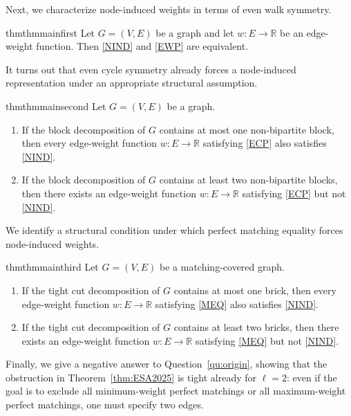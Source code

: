 \documentclass{article}
\theoremstyle{plain}
\theoremstyle{definition}
\begin{document}
Next, we characterize node-induced weights in terms of even walk symmetry.

\begin{restatable}{thm}{thmmainfirst}
\label{thm:main1}
    Let $G=(V,E)$ be a graph and let $w\colon E \to \mathbb{R}$ be an edge-weight function. Then \ref{NIND} and \ref{EWP} are equivalent.
\end{restatable}

It turns out that even cycle symmetry already forces a node-induced representation under an appropriate structural assumption.

\begin{restatable}{thm}{thmmainsecond}
\label{thm:main2}
Let $G=(V,E)$ be a graph.
\begin{enumerate}[label=(\roman*)]\itemsep0em
    \item If the block decomposition of $G$ contains at most one non-bipartite block, then every edge-weight function $w\colon E \to \mathbb{R}$ satisfying \ref{ECP} also satisfies \ref{NIND}. \label{it:2i}
    \item If the block decomposition of $G$ contains at least two non-bipartite blocks, then there exists an edge-weight function $w\colon E \to \mathbb{R}$ satisfying \ref{ECP} but not \ref{NIND}. \label{it:2ii}
\end{enumerate}
\end{restatable}

We identify a structural condition under which perfect matching equality forces node-induced weights.

\begin{restatable}{thm}{thmmainthird}
\label{thm:main3}
Let $G=(V,E)$ be a matching-covered graph.
\begin{enumerate}[label=(\roman*)]\itemsep0em
    \item If the tight cut decomposition of $G$ contains at most one brick, then every edge-weight function $w\colon E \to \mathbb{R}$ satisfying \ref{MEQ} also satisfies \ref{NIND}. \label{it:3i}
    \item If the tight cut decomposition of $G$ contains at least two bricks, then there exists an edge-weight function $w\colon E \to \mathbb{R}$ satisfying \ref{MEQ} but not \ref{NIND}.\label{it:3ii}
\end{enumerate}
\end{restatable}

Finally, we give a negative answer to Question~\ref{qu:origin}, showing that the obstruction in Theorem~\ref{thm:ESA2025} is tight already for $\ell=2$: even if the goal is to exclude all minimum-weight perfect matchings or all maximum-weight perfect matchings, one must specify two edges.
\end{document}
